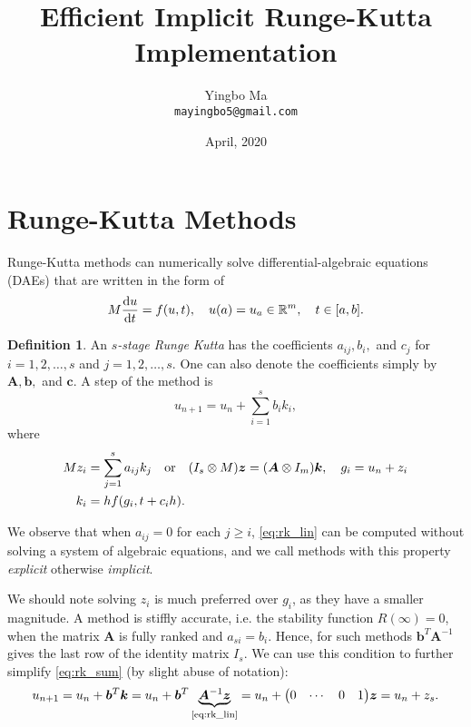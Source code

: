 \documentclass[a4paper,9pt]{article}
\theoremstyle{definition}
\newtheorem{definition}{Definition}[section]
\theoremstyle{remark}
\begin{document}
\author{Yingbo Ma\\
        \tt{mayingbo5@gmail.com}}
\title{Efficient Implicit Runge-Kutta Implementation}
\date{April, 2020}

\maketitle


\section{Runge-Kutta Methods}
Runge-Kutta methods can numerically solve differential-algebraic equations
(DAEs) that are written in the form of
\begin{equation}
  M \dv{u}{t} = f(u, t),\quad u(a)=u_a \in \mathbb{R}^m, \quad t\in [a, b].
\end{equation}

\begin{definition} \label{def:rk}
  An \emph{$s$-stage Runge Kutta} has the coefficients $a_{ij}, b_i,$ and $c_j$
  for $i=1,2,\dots,s$ and $j=1,2,\dots,s$. One can also denote the coefficients
  simply by $\bm{A}, \bm{b},$ and $\bm{c}$. A step of the method is
  \begin{equation} \label{eq:rk_sum}
    u_{n+1} = u_n + \sum_{i=1}^s b_i k_i,
  \end{equation}
  where
  \begin{align} \label{eq:rk_lin}
    M z_i &= \sum_{j=1}^s a_{ij}k_j\qq{or} (I_s \otimes M) \bm{z} =
    (\bm{A}\otimes I_m)\bm{k}, \quad g_i = u_n + z_i \\
    k_i &= hf(g_i, t+c_ih).
  \end{align}
\end{definition}

We observe that when $a_{ij} = 0$ for each $j\ge i$, \cref{eq:rk_lin} can be
computed without solving a system of algebraic equations, and we call methods
with this property \emph{explicit} otherwise \emph{implicit}.

We should note solving $z_i$ is much preferred over $g_i$, as they have a
smaller magnitude. A method is stiffly accurate, i.e. the stability function
$R(\infty) = 0$, when the matrix $\bm{A}$ is fully ranked and $a_{si} = b_i$.
Hence, for such methods $\bm{b}^T\bm{A}^{-1}$ gives the last row of the identity
matrix $I_s$. We can use this condition to further simplify \cref{eq:rk_sum} (by
slight abuse of notation):
\begin{equation} \label{eq:rk_sim}
  u_{n+1} = u_n + \bm{b}^T\bm{k} = u_n +
  \bm{b}^T\underbrace{\bm{A}^{-1}\bm{z}}_\text{\cref{eq:rk_lin}} = u_n +
  \mqty(0 & \cdots & 0 & 1)\bm{z} = u_n + z_s.
\end{equation}
\end{document}
